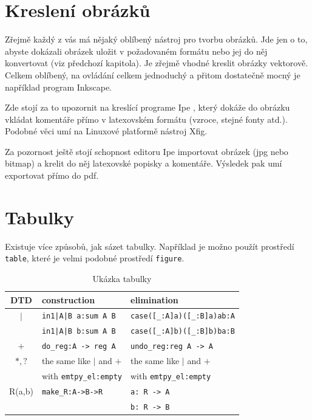 \documentclass[11pt,twoside,a4paper]{book}
\begin{document}
\section{Kreslení obrázků}
Zřejmě každý z vás má nějaký oblíbený nástroj pro tvorbu obrázků. Jde jen o to, abyste dokázali obrázek uložit v požadovaném formátu nebo jej do něj konvertovat (viz předchozí kapitola). Je zřejmě vhodné kreslit obrázky vektorově. Celkem oblíbený, na ovládání celkem jednoduchý a přitom dostatečně mocný je například program Inkscape.

Zde stojí za to upozornit na kreslící programe Ipe \cite{ipe}, který dokáže do obrázku vkládat komentáře přímo v latexovském formátu (vzroce, stejné fonty atd.). Podobné věci umí na Linuxové platformě nástroj Xfig. 

Za pozornost ještě stojí schopnost editoru Ipe importovat obrázek (jpg nebo bitmap) a krelit do něj latexovské popisky a komentáře. Výsledek pak umí exportovat přímo do pdf.

\section{Tabulky}
Existuje více způsobů, jak sázet tabulky. Například je možno použít prostředí \verb|table|, které je velmi podobné prostředí \verb|figure|. 

\begin{table}
\begin{center}
\begin{tabular}{|c|l|l|}
\hline
\textbf{DTD} & \textbf{construction} & \textbf{elimination} \\
\hline
$\mid$ & \verb+in1|A|B a:sum A B+ & \verb+case([_:A]a)([_:B]a)ab:A+\\
&\verb+in1|A|B b:sum A B+ & \verb+case([_:A]b)([_:B]b)ba:B+\\
\hline
$+$&\verb+do_reg:A -> reg A+&\verb+undo_reg:reg A -> A+\\
\hline
$*,?$& the same like $\mid$ and $+$ & the same like $\mid$ and $+$\\
& with \verb+emtpy_el:empty+ & with \verb+emtpy_el:empty+\\
\hline
R(a,b) & \verb+make_R:A->B->R+ & \verb+a: R -> A+\\
 & & \verb+b: R -> B+\\
\hline
\end{tabular}
\end{center}
\caption{Ukázka tabulky}
\label{tab:tab1}
\end{table}
\end{document}
